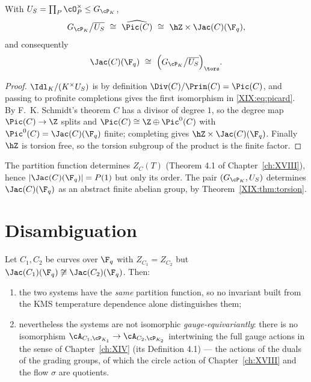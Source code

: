 \begin{theorem}\label{XIX:thm:torsion}
With $U_S=\prod_P\cO_P^\times\le G_{\cP_K}$,
\begin{equation}\label{XIX:eq:picard}
G_{\cP_K}\big/\overline{U_S}\ \cong\ \widehat{\Pic(C)}\ \cong\ \hZ\times\Jac(C)(\F_q),
\end{equation}
and consequently
\[
\Jac(C)(\F_q)\ \cong\ \Bigl(G_{\cP_K}\big/\overline{U_S}\Bigr)_{\tors}.
\]
\end{theorem}

\begin{proof}
$\Idl_K/(K^\times U_S)$ is by definition $\Div(C)/\Prin(C)=\Pic(C)$, and passing to profinite
completions gives the first isomorphism in \eqref{XIX:eq:picard}. By F.~K. Schmidt's theorem
\cite{Rosen} $C$
has a divisor of degree $1$, so the degree map $\Pic(C)\to\Z$ splits and
$\Pic(C)\cong\Z\oplus\Pic^0(C)$ with $\Pic^0(C)=\Jac(C)(\F_q)$ finite; completing gives
$\hZ\times\Jac(C)(\F_q)$. Finally $\hZ$ is torsion free, so the torsion subgroup of the
product is the finite factor.
\end{proof}

\begin{corollary}\label{XIX:cor:layers}
The partition function determines $Z_C(T)$ (Theorem 4.1 of Chapter~\ref{ch:XVIII}), hence
$|\Jac(C)(\F_q)|=P(1)$ but only its order. The pair $(G_{\cP_K},U_S)$ determines
$\Jac(C)(\F_q)$ as an abstract finite abelian group, by Theorem~\ref{XIX:thm:torsion}.
\end{corollary}

\section{Disambiguation}

\begin{theorem}\label{XIX:thm:disambig}
Let $C_1,C_2$ be curves over $\F_q$ with $Z_{C_1}=Z_{C_2}$ but
$\Jac(C_1)(\F_q)\not\cong\Jac(C_2)(\F_q)$. Then:
\begin{enumerate}
\item the two systems have the \emph{same} partition function, so no invariant built from
the KMS temperature dependence alone distinguishes them;
\item nevertheless the systems are not isomorphic \emph{gauge-equivariantly}: there is no
isomorphism $\cA_{C_1,\cP_{K_1}}\to\cA_{C_2,\cP_{K_2}}$ intertwining the full gauge actions
in the sense of Chapter~\ref{ch:XIV} (its Definition 4.1) --- the actions of the duals of the grading
groups, of which the circle action of Chapter~\ref{ch:XVIII} and the flow $\sigma$ are quotients.
\end{enumerate}
\end{theorem}

